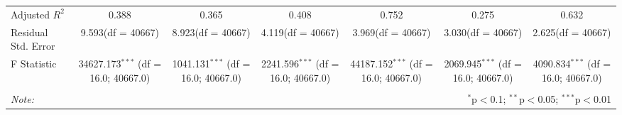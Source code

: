 \begin{table}[!htbp]
\begin{tabular}{@{\extracolsep{5pt}}lcccccc}
 Adjusted $R^2$ & 0.388 & 0.365 & 0.408 & 0.752 & 0.275 & 0.632 \\
 Residual Std. Error & 9.593(df = 40667) & 8.923(df = 40667) & 4.119(df = 40667) & 3.969(df = 40667) & 3.030(df = 40667) & 2.625(df = 40667)  \\
 F Statistic & 34627.173$^{***}$ (df = 16.0; 40667.0) & 1041.131$^{***}$ (df = 16.0; 40667.0) & 2241.596$^{***}$ (df = 16.0; 40667.0) & 44187.152$^{***}$ (df = 16.0; 40667.0) & 2069.945$^{***}$ (df = 16.0; 40667.0) & 4090.834$^{***}$ (df = 16.0; 40667.0) \\
\hline
\hline \\[-1.8ex]
\textit{Note:} & \multicolumn{6}{r}{$^{*}$p$<$0.1; $^{**}$p$<$0.05; $^{***}$p$<$0.01} \\
\end{tabular}
\end{table}